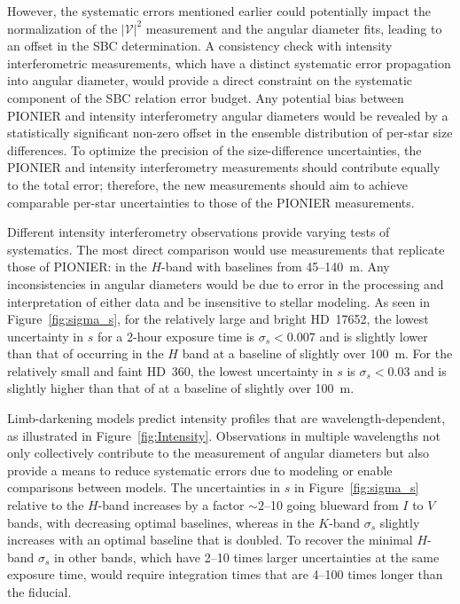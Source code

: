 \documentclass[linenumbers,trackchanges]{aastex701}
\begin{document}
However, the systematic errors mentioned earlier could potentially impact the normalization of the  $|\mathcal{V}|^2$ measurement  and the angular diameter fits, leading to an offset in the SBC determination.
A consistency check with intensity interferometric measurements, which have a distinct systematic error propagation into angular diameter, would provide a direct constraint on the systematic component of the SBC relation error budget.
Any potential bias between PIONIER and intensity interferometry angular diameters would be revealed by a statistically significant non-zero offset in the ensemble distribution of per-star size differences. To optimize the precision of the size-difference uncertainties, the PIONIER and intensity interferometry measurements should contribute equally to the total error; therefore, the new measurements should aim to achieve comparable per-star uncertainties to those of the PIONIER measurements.

Different intensity interferometry observations  provide varying tests of systematics.
The most direct comparison would use measurements that replicate those of PIONIER: in the $H$-band with baselines from 45--140~m.  Any inconsistencies in angular diameters would be due
to  error in the processing and interpretation of either data and be insensitive to stellar modeling.
As seen in Figure~\ref{fig:sigma_s}, 
for the relatively large and bright HD~17652, the lowest uncertainty in $s$ for a 2-hour exposure time is $\sigma_s < 0.007$ and is slightly
lower than that of \citet{2018A&A...616A..68G} occurring in the $H$ band at a baseline of slightly over 100~m.   For the relatively small and faint HD~360,  the lowest uncertainty in $s$ is $\sigma_s < 0.03$ and is
slightly higher than that of \citet{2018A&A...616A..68G} at a baseline of slightly over 100~m. 

Limb-darkening models predict intensity profiles that are wavelength-dependent, as illustrated in  Figure~\ref{fig:Intensity}.   Observations in multiple wavelengths not only collectively contribute to the measurement of angular diameters but also provide a means to reduce systematic errors due to modeling or enable comparisons between models.
The uncertainties in $s$ in Figure~\ref{fig:sigma_s} relative to the $H$-band increases by a factor $\sim 2$--10
going blueward from $I$ to $V$ bands, with decreasing optimal baselines, whereas in the $K$-band  $\sigma_s$ slightly increases with an optimal baseline that is doubled.  To recover the minimal $H$-band $\sigma_s$ in other bands, which have
2--10 times larger uncertainties at the same exposure time, would require integration times that are
4--100 times longer than the fiducial.
\end{document}
